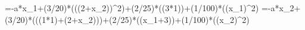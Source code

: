 =-a*x_1+(3/20)*\sin(((2+x_2))^2)+(2/25)*\cos((3*1))+(1/100)*((x_1)^2)
=-a*x_2+(3/20)*\sin(((1*1)+(2+x_2)))+(2/25)*\cos((x_1+3))+(1/100)*((x_2)^2)
